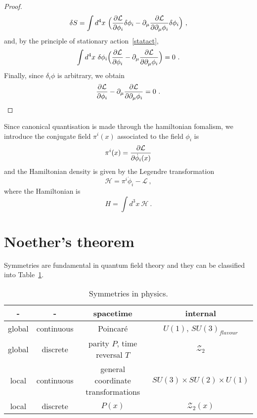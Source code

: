\begin{proof}
\begin{equation*}
            \delta S = \int d^4 x ~ \Big( \frac{\partial\mathcal L}{\partial\phi_i} \delta \phi_i - \partial_\mu \frac{\partial\mathcal L}{\partial\partial_\mu \phi_i} \delta \phi_i \Big) ~,
        \end{equation*}
        and, by the principle of stationary action~\eqref{statact}, 
        \begin{equation*}
            \int d^4 x ~ \delta \phi_i  \Big( \frac{\partial\mathcal L}{\partial\phi_i} - \partial_\mu \frac{\partial\mathcal L}{\partial\partial_\mu \phi_i} \Big) = 0 ~.
        \end{equation*}
        Finally, since $\delta_i \phi$ is arbitrary, we obtain
        \begin{equation*}
            \frac{\partial\mathcal L}{\partial\phi_i} - \partial_\mu \frac{\partial\mathcal L}{\partial\partial_\mu \phi_i} = 0 ~.
        \end{equation*}
    \end{proof}
    Since canonical quantisation is made through the hamiltonian fomalism, we introduce the conjugate field $\pi^i(x)$ associated to the field $\phi_i$ is 
    \begin{equation*}
        \pi^i(x) = \frac{\partial\mathcal L}{\partial\dot \phi_i(x)}
    \end{equation*}
    and the Hamiltonian density is given by the Legendre transformation 
    \begin{equation*}
        \mathcal H = \pi^i \dot \phi_i - \mathcal L ~,
    \end{equation*}
    where the Hamiltonian is 
    \begin{equation*}
        H = \int d^3 x ~ \mathcal H ~.
    \end{equation*}

\section{Noether's theorem}

    Symmetries are fundamental in quantum field theory and they can be classified into Table~\ref{table:symm}.

    \begin{table}[h!]
        \centering
        \begin{tabular}{c | c |c | c }
            - & - & spacetime & internal\\
            \hline
            global & continuous & Poincaré & $U(1)$, $SU(3)_{flavour}$ \\ 
            global & discrete & parity $P$, time reversal $T$ & $\mathcal Z_2$ \\ 
            local & continuous & general coordinate transformations & $SU(3) \times SU(2) \times U(1)$ \\ 
            local & discrete & $P(x)$ & $\mathcal Z_2 (x)$ \\ 
        \end{tabular}
        \caption{Symmetries in physics.}
        \label{table:symm}
    \end{table}

